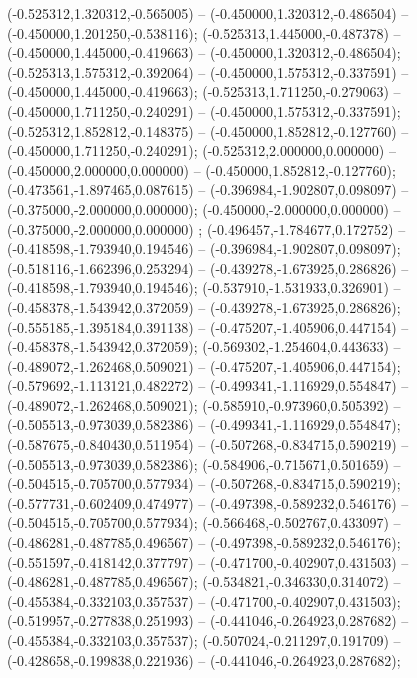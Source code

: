  (-0.525312,1.320312,-0.565005) -- (-0.450000,1.320312,-0.486504) -- (-0.450000,1.201250,-0.538116);
 (-0.525313,1.445000,-0.487378) -- (-0.450000,1.445000,-0.419663) -- (-0.450000,1.320312,-0.486504);
 (-0.525313,1.575312,-0.392064) -- (-0.450000,1.575312,-0.337591) -- (-0.450000,1.445000,-0.419663);
 (-0.525313,1.711250,-0.279063) -- (-0.450000,1.711250,-0.240291) -- (-0.450000,1.575312,-0.337591);
 (-0.525312,1.852812,-0.148375) -- (-0.450000,1.852812,-0.127760) -- (-0.450000,1.711250,-0.240291);
 (-0.525312,2.000000,0.000000) -- (-0.450000,2.000000,0.000000) -- (-0.450000,1.852812,-0.127760);
 (-0.473561,-1.897465,0.087615) -- (-0.396984,-1.902807,0.098097) -- (-0.375000,-2.000000,0.000000);
 (-0.450000,-2.000000,0.000000) -- (-0.375000,-2.000000,0.000000) ;
 (-0.496457,-1.784677,0.172752) -- (-0.418598,-1.793940,0.194546) -- (-0.396984,-1.902807,0.098097);
 (-0.518116,-1.662396,0.253294) -- (-0.439278,-1.673925,0.286826) -- (-0.418598,-1.793940,0.194546);
 (-0.537910,-1.531933,0.326901) -- (-0.458378,-1.543942,0.372059) -- (-0.439278,-1.673925,0.286826);
 (-0.555185,-1.395184,0.391138) -- (-0.475207,-1.405906,0.447154) -- (-0.458378,-1.543942,0.372059);
 (-0.569302,-1.254604,0.443633) -- (-0.489072,-1.262468,0.509021) -- (-0.475207,-1.405906,0.447154);
 (-0.579692,-1.113121,0.482272) -- (-0.499341,-1.116929,0.554847) -- (-0.489072,-1.262468,0.509021);
 (-0.585910,-0.973960,0.505392) -- (-0.505513,-0.973039,0.582386) -- (-0.499341,-1.116929,0.554847);
 (-0.587675,-0.840430,0.511954) -- (-0.507268,-0.834715,0.590219) -- (-0.505513,-0.973039,0.582386);
 (-0.584906,-0.715671,0.501659) -- (-0.504515,-0.705700,0.577934) -- (-0.507268,-0.834715,0.590219);
 (-0.577731,-0.602409,0.474977) -- (-0.497398,-0.589232,0.546176) -- (-0.504515,-0.705700,0.577934);
 (-0.566468,-0.502767,0.433097) -- (-0.486281,-0.487785,0.496567) -- (-0.497398,-0.589232,0.546176);
 (-0.551597,-0.418142,0.377797) -- (-0.471700,-0.402907,0.431503) -- (-0.486281,-0.487785,0.496567);
 (-0.534821,-0.346330,0.314072) -- (-0.455384,-0.332103,0.357537) -- (-0.471700,-0.402907,0.431503);
 (-0.519957,-0.277838,0.251993) -- (-0.441046,-0.264923,0.287682) -- (-0.455384,-0.332103,0.357537);
 (-0.507024,-0.211297,0.191709) -- (-0.428658,-0.199838,0.221936) -- (-0.441046,-0.264923,0.287682);

